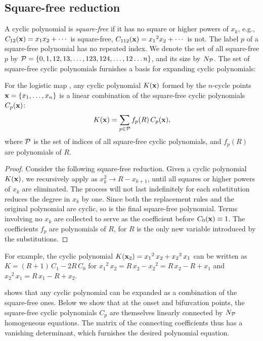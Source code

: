 \documentclass{ws-ijbc}
\begin{document}
\subsection{Square-free reduction}




A cyclic polynomial is \emph{square-free}
  if it has no square or higher powers of $x_k$,
e.g., $C_{12}(\mathbf{x}) = x_1 x_2 + \cdots$ is square-free,
  $C_{112}(\mathbf{x}) = {x_1}^2 x_2 + \cdots$ is not.
The label $p$ of a square-free polynomial
  has no repeated index.
We denote the set of all square-free $p$ by
$\mathcal P = \{0, 1, 12, 13, \ldots, 123, 124, \ldots, 12\dots n\}$,
and its size by $N_\mathcal P$.
%
%
The set of square-free cyclic polynomials
  furnishes a basis for expanding cyclic polynomials:



\begin{theorem}
  For the logistic map ,
  any cyclic polynomial $K(\mathbf{x})$
  formed by the $n$-cycle points
  $\mathbf{x} = \{x_1, \ldots, x_n\}$
  is a linear combination of
  the square-free cyclic polynomials $C_p(\mathbf{x})$:
\[
  K(\mathbf{x}) = \sum_{p \in \mathcal P} f_p(R) \, C_p(\mathbf{x}),
\]
  where $\mathcal P$ %
  is the set of indices of all square-free cyclic polynomials,
  and $f_p(R)$ are polynomials of $R$.
  \label{thm:sqrfree}
\end{theorem}
%
%
\begin{proof}
Consider the following square-free reduction.
%
Given a cyclic polynomial $K(\mathbf{x})$,
  we recursively apply  as
  $x_k^2 \rightarrow R - x_{k+1}$,
  until all squares or higher powers of $x_k$ are eliminated.
The process will not last indefinitely
  for each substitution reduces the degree in $x_k$ %
  by one.
Since both the replacement rules and the original polynomial are cyclic,
  so is the final square-free polynomial.
Terms involving no $x_k$
  are collected to serve as the coefficient before $C_0(\mathbf{x}) \equiv 1$.
The coefficients $f_p$ are polynomials of $R$,
  for $R$ is the only new variable introduced by the substitutions.
\end{proof}
%
%
For example, the cyclic polynomial
  $K(\mathbf{x}_{2}) = {x_1}^2 \, x_2 + {x_2}^2 \, x_1$
can be written as $K = (R + 1) \, C_{1} - 2 R \, C_0$
for
${x_1}^2 \, x_2 = R \, x_2 - {x_2}^2 = R \, x_2 - R + x_1$ and
${x_2}^2 \, x_1 = R \, x_1 - R + x_2$.


  shows that any cyclic polynomial can be expanded
  as a combination of the square-free ones.
Below we show that at the onset and bifurcation points,
  the square-free cyclic polynomials $C_p$ are themselves
  linearly connected by $N_\mathcal P$ homogeneous equations.
The matrix of the connecting coefficients thus has a vanishing determinant,
  which furnishes the desired polynomial equation.
\end{document}
